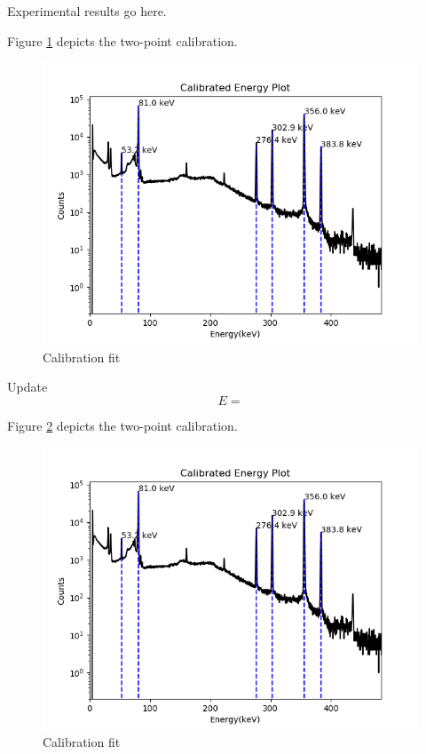 Experimental results go here.

Figure \ref{fig:raw_data} depicts the two-point calibration.

\begin{figure}[!htb]
\centering
\includegraphics[width=0.5\linewidth]{images/Ba133_calibrated.png}
\caption{Calibration fit}
\label{fig:raw_data}
\end{figure}

Update
\begin{equation}
E =
\end{equation}

Figure \ref{fig:CE} depicts the two-point calibration.

\begin{figure}[!htb]
\centering
\includegraphics[width=0.5\linewidth]{images/Ba133_calibrated.png}
\caption{Calibration fit}
\label{fig:CE}
\end{figure}
